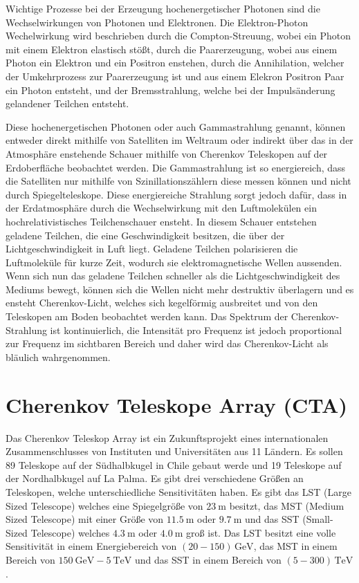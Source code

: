 Wichtige Prozesse bei der Erzeugung hochenergetischer Photonen sind die Wechselwirkungen von Photonen und Elektronen. Die
Elektron-Photon Wechelwirkung wird beschrieben durch die
Compton-Streuung, wobei ein Photon mit einem Elektron elastisch stößt, durch die Paarerzeugung, wobei aus einem Photon ein Elektron
und ein Positron enstehen, durch die Annihilation, welcher der Umkehrprozess zur Paarerzeugung ist und aus einem Elekron Positron Paar
ein Photon entsteht, und der Bremsstrahlung, welche bei der Impulsänderung gelandener Teilchen entsteht.

Diese hochenergetischen Photonen oder auch Gammastrahlung genannt, können entweder direkt mithilfe von Satelliten im Weltraum oder
indirekt über das in der Atmosphäre enstehende Schauer mithilfe von Cherenkov Teleskopen auf der Erdoberfläche beobachtet werden.
Die Gammastrahlung ist so energiereich, dass die Satelliten nur mithilfe von Szinillationszählern diese messen können und nicht
durch Spiegelteleskope. Diese energiereiche Strahlung sorgt jedoch dafür, dass in der Erdatmosphäre durch die Wechselwirkung mit
den Luftmolekülen ein hochrelativistisches Teilchenschauer ensteht. In diesem Schauer entstehen geladene Teilchen, die eine Geschwindigkeit
besitzen, die über der Lichtgeschwindigkeit in Luft liegt. Geladene Teilchen polarisieren die Luftmoleküle für kurze Zeit, wodurch sie
elektromagnetische Wellen aussenden. Wenn sich nun das geladene Teilchen schneller als die Lichtgeschwindigkeit des Mediums bewegt,
können sich die Wellen nicht mehr destruktiv überlagern und es ensteht Cherenkov-Licht, welches sich kegelförmig ausbreitet und von
den Teleskopen am Boden beobachtet werden kann. Das Spektrum der Cherenkov-Strahlung ist kontinuierlich, die Intensität pro Frequenz ist
jedoch proportional zur Frequenz im sichtbaren Bereich und daher wird das Cherenkov-Licht als bläulich wahrgenommen.

\section{Cherenkov Teleskope Array (CTA)}

Das Cherenkov Teleskop Array ist ein Zukunftsprojekt eines internationalen Zusammenschlusses von Instituten und Universitäten aus
11 Ländern. Es sollen 89 Teleskope auf der Südhalbkugel in Chile gebaut werde und 19 Teleskope auf der Nordhalbkugel auf La Palma.
Es gibt drei verschiedene Größen an Teleskopen, welche unterschiedliche Sensitivitäten haben. Es gibt das LST (Large Sized Telescope)
welches eine Spiegelgröße von $\SI{23}{\m}$ besitzt, das MST (Medium Sized Telescope) mit einer Größe von $\SI{11.5}{\m}$ oder $\SI{9.7}{\m}$
und das SST (Small-Sized Telescope) welches $\SI{4.3}{\m}$ oder $\SI{4.0}{\m}$ groß ist.
Das LST besitzt eine volle Sensitivität in einem Energiebereich von $(20-150)\,\si{\giga\eV}$, das MST in einem Bereich von
$\SI{150}{\giga\eV}-\SI{5}{\tera\eV}$ und das SST in einem Bereich von $(5-300)\,\si{\tera\eV}$.

